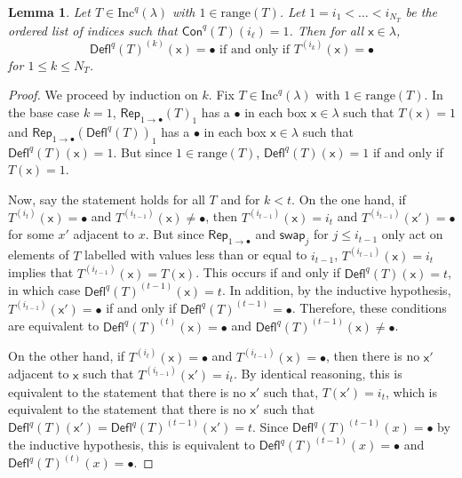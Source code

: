\documentclass[12pt]{amsart}
\newcommand{\x}{\ensuremath{\mathsf{x}}}
\newtheorem{lemma}[theorem]{Lemma}
\theoremstyle{definition}
\theoremstyle{remark}
\numberwithin{equation}{section}
\newcommand{\inc}{\ensuremath{\mathrm{Inc}}}
\newcommand{\swap}{\ensuremath{\mathsf{swap}}}
\newcommand{\rep}{\ensuremath{\mathsf{Rep}}}
\newcommand{\deflate}{\ensuremath{\mathsf{Defl}}}
\newcommand{\content}{\ensuremath{\mathsf{Con}}}
\begin{document}
\begin{lemma} \label{lem:bullet_placement}
Let $T \in \inc^q(\lambda)$ with $1 \in \mathrm{range}(T)$. Let $1 = i_1 < \dots < i_{N_T}$ be the ordered list of indices such that $\content^q(T)(i_\ell) = 1$. Then for all $\x \in \lambda$,
 \begin{equation}\label{eq:gappy_promotion2}
\deflate^q(T)^{(k)}(\x) = \bullet \text{ if and only if } T^{(i_k)}(\x) = \bullet
\end{equation}
for $1 \leq k \leq N_T$.
\end{lemma}
\begin{proof} We proceed by induction on $k$. Fix $T \in \inc^q(\lambda)$  with $1 \in \mathrm{range}(T)$. In the base case $k = 1$,  $\rep_{1 \rightarrow \bullet}(T)_{1}$ has a $\bullet$ in each box $\x \in \lambda$ such that $T(\x) = 1$ and $\rep_{1 \rightarrow \bullet}(\deflate^q(T))_{1}$ has a $\bullet$ in each box $\x \in \lambda$ such that $\deflate^q(T)(\x) = 1$. But since $1 \in \mathrm{range}(T)$, $\deflate^q(T)(\x) = 1$ if and only if $T(\x) = 1$. 


Now, say the statement holds for all $T$ and for $k < t$. On the one hand, if $T^{(i_t)}(\x) = \bullet$ and $T^{(i_{t-1})}(\x) \neq \bullet$, then $T^{(i_{t-1})}(\x) = i_t$ and $T^{(i_{t-1})}(\x') = \bullet$ for some $x'$ adjacent to $x$. But since $\rep_{1 \rightarrow \bullet}$ and $\swap_j$ for  $j \leq i_{t-1}$ only act on elements of $T$ labelled with values less than or equal to $i_{t-1}$, $T^{(i_{t-1})}(\x) = i_t$ implies that $T^{(i_{t-1})}(\x) = T(\x)$. This occurs if and only if $\deflate^q(T)(\x) = t$, in which case $\deflate^q(T)^{(t-1)}(\x) = t$. In addition, by the inductive hypothesis, $T^{(i_{t-1})}(\x') = \bullet$ if and only if $\deflate^q(T)^{(t-1)} = \bullet$. Therefore, these conditions are equivalent to $\deflate^q(T)^{(t)}(\x) = \bullet$ and $\deflate^q(T)^{(t-1)}(\x) \neq \bullet$. 

On the other hand, if $T^{(i_t)}(\x) = \bullet$ and $T^{(i_{t-1})}(\x) = \bullet$, then there is no $\x'$ adjacent to $\x$ such that $T^{(i_{t-1})}(\x') = i_t$. By identical reasoning, this is equivalent to the statement that there is no $\x'$ such that, $T(\x') = i_t$, which is equivalent to the statement that there is no $\x'$ such that $\deflate^q(T)(\x') = \deflate^q(T)^{(t-1)}(\x') = t$. Since $\deflate^q(T)^{(t-1)}(x) = \bullet$ by the inductive hypothesis, this is equivalent to $\deflate^q(T)^{(t-1)}(x) = \bullet$ and $\deflate^q(T)^{(t)}(x) = \bullet$.
\end{proof}
\end{document}
